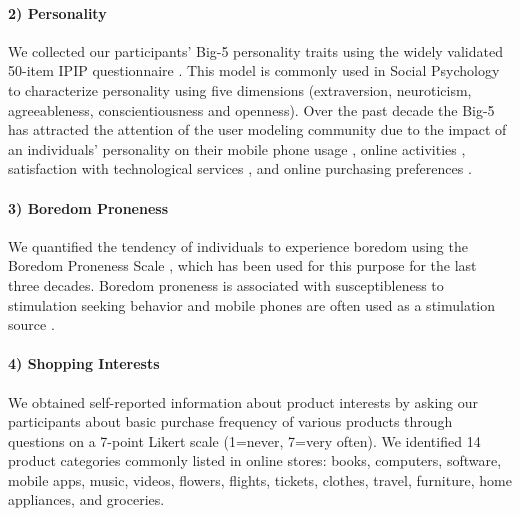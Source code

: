 \paragraph{\textbf{2) Personality}} We collected our participants' Big-5 personality traits using the widely validated 50-item IPIP questionnaire \cite{goldberg2006international}. This model is commonly used in Social Psychology to characterize personality using five dimensions (extraversion, neuroticism, agreeableness, conscientiousness and openness). Over the past decade the Big-5 has attracted the attention of the user modeling community due to the impact of an individuals' personality on their mobile phone usage \cite{butt2008personality}, online activities \cite{ramirez2010relationship}, satisfaction with technological services \cite{oliveira2013influence}, and online purchasing preferences \cite{huang2010relationship}.

\paragraph{\textbf{3) Boredom Proneness}} We quantified the tendency of individuals to experience boredom using the Boredom Proneness Scale \cite{matic2015boredom}, which has been used for this purpose for the last three decades. Boredom proneness is associated with susceptibleness to stimulation seeking behavior and mobile phones are often used as a stimulation source \cite{barabasi2005origin}.

\paragraph{\textbf{4) Shopping Interests}} We obtained self-reported information about product interests by asking our participants about basic purchase frequency of various products through questions on a 7-point Likert scale (1=never, 7=very often). We identified 14 product categories commonly listed in online stores: books, computers, software, mobile apps, music, videos, flowers, flights, tickets, clothes, travel, furniture, home appliances, and groceries. 


